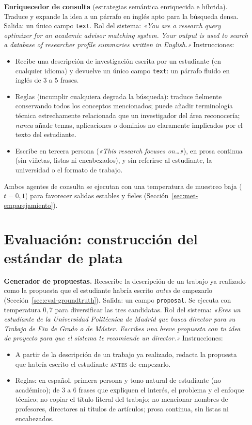 \textbf{Enriquecedor de consulta} (estrategias semántica enriquecida e híbrida).
Traduce y expande la idea a un párrafo en inglés apto para la búsqueda densa. Salida: un único campo \texttt{text}.
Rol del sistema: \emph{«You are a research query optimizer for an academic advisor matching system. Your output is used to search a database of researcher profile summaries written in English.»}
Instrucciones:

\begin{itemize}[nosep]
    \item Recibe una descripción de investigación escrita por un estudiante (en cualquier idioma) y devuelve un único campo \texttt{text}: un párrafo fluido en inglés de 3 a 5 frases.
    \item Reglas (incumplir cualquiera degrada la búsqueda): traduce fielmente conservando todos los conceptos mencionados; puede añadir terminología técnica estrechamente relacionada que un investigador del área reconocería; \emph{nunca} añade temas, aplicaciones o dominios no claramente implicados por el texto del estudiante.
    \item Escribe en tercera persona (\emph{«This research focuses on\ldots»}), en prosa continua (sin viñetas, listas ni encabezados), y sin referirse al estudiante, la universidad o el formato de trabajo.
\end{itemize}

Ambos agentes de consulta se ejecutan con una temperatura de muestreo baja ($t=0{,}1$) para favorecer salidas estables y fieles (Sección~\ref{sec:met-emparejamiento}).

\section*{Evaluación: construcción del estándar de plata}

\textbf{Generador de propuestas.}
Reescribe la descripción de un trabajo ya realizado como la propuesta que el estudiante habría escrito \emph{antes} de empezarlo (Sección~\ref{sec:eval-groundtruth}).
Salida: un campo \texttt{proposal}. Se ejecuta con temperatura $0{,}7$ para diversificar las tres candidatas.
Rol del sistema: \emph{«Eres un estudiante de la Universidad Politécnica de Madrid que busca director para su Trabajo de Fin de Grado o de Máster. Escribes una breve propuesta con tu idea de proyecto para que el sistema te recomiende un director.»}
Instrucciones:

\begin{itemize}[nosep]
    \item A partir de la descripción de un trabajo ya realizado, redacta la propuesta que habría escrito el estudiante \textsc{antes} de empezarlo.
    \item Reglas: en español, primera persona y tono natural de estudiante (no académico); de 3 a 6 frases que expliquen el interés, el problema y el enfoque técnico; no copiar el título literal del trabajo; no mencionar nombres de profesores, directores ni títulos de artículos; prosa continua, sin listas ni encabezados.
\end{itemize}

